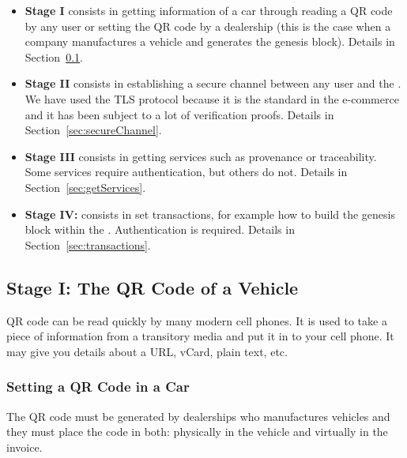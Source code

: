 \begin{itemize}
  \item \textbf{Stage I} consists in getting information of a car through reading
    a QR code by any user or setting the QR code by a dealership (this is the 
    case when a company manufactures a vehicle 
    and generates the genesis block). Details in Section~\ref{ssec:qrcode}.
  \item \textbf{Stage II} consists in establishing a secure channel between any user
    and the \blockchaincarnetwork. We
    have used the TLS protocol because it is the standard in the
    e-commerce and it has been subject to a lot of verification proofs.
    Details in Section~\ref{sec:secureChannel}.
  \item \textbf{Stage III} consists in getting services such as provenance or 
    traceability. Some services require authentication, but others do not.
    Details in Section~\ref{sec:getServices}.  
  \item \textbf{Stage IV:} consists in set transactions, for example how to build
    the genesis block within the  \blockchaincarnetwork. Authentication is required. 
    Details in Section~\ref{sec:transactions}. 
\end{itemize}

\subsection{Stage I: The QR Code of a Vehicle}
\label{ssec:qrcode}
QR code can be read quickly by many modern cell phones. It is used to take a piece of information from a 
transitory media and put it in to your cell phone. It may give you details about a URL, vCard, plain text, etc.

\subsubsection{Setting a QR Code in a Car}
\label{sssec:settingQR}
The QR code must be generated by dealerships who manufactures vehicles and they must place the code
in both: physically in the vehicle and virtually in the invoice.

